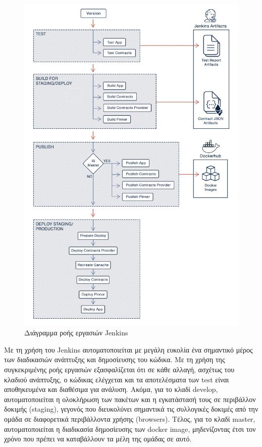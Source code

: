 \begin{figure}[H]
    \centering
    \includegraphics[width=.9\textwidth]{assets/figures/chapter-4/4.1.implementation-methodology-jenkins-pipeline}
    \caption{Διάγραμμα ροής εργασιών Jenkins}
    \label{figure:4.1.implementation-methodology-jenkins-pipeline}
\end{figure}

\vspace{\baselineskip}

Με τη χρήση του Jenkins αυτοματοποιείται με μεγάλη ευκολία ένα σημαντικό μέρος των διαδικασιών ανάπτυξης και δημοσίευσης του κώδικα. Με τη χρήση της συγκεκριμένης ροής εργασιών εξασφαλίζεται ότι σε κάθε αλλαγή, ασχέτως του κλαδιού ανάπτυξης, ο κώδικας ελέγχεται και τα αποτελέσματα των test είναι αποθηκευμένα και διαθέσιμα για ανάλυση. Ακόμα, για το κλαδί develop, αυτοματοποιείται η ολοκλήρωση των πακέτων και η εγκατάστασή τους σε περιβάλλον δοκιμής (staging), γεγονός που διευκολύνει σημαντικά τις συλλογικές δοκιμές από την ομάδα σε διαφορετικά περιβάλλοντα χρήσης (browsers). Τέλος, για το κλαδί master, αυτοματοποιείται η διαδικασία δημοσίευσης των docker image, μηδενίζοντας έτσι τον χρόνο που πρέπει να καταβάλλουν τα μέλη της ομάδας σε αυτό.
